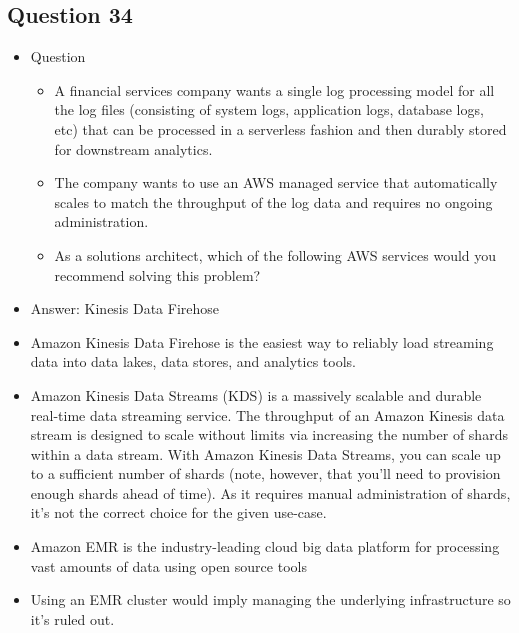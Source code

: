 \documentclass[]{scrartcl}
\begin{document}
\subsection{Question 34}
\begin{itemize}
	\item Question
	\begin{itemize}
		\item A financial services company wants a single log processing model for all the log files (consisting of system logs, application logs, database logs, etc) that can be processed in a serverless fashion and then durably stored for downstream analytics. 
		\item The company wants to use an AWS managed service that automatically scales to match the throughput of the log data and requires no ongoing administration.
		\item As a solutions architect, which of the following AWS services would you recommend solving this problem?
	\end{itemize}
	\item Answer: Kinesis Data Firehose
	\item Amazon Kinesis Data Firehose is the easiest way to reliably load streaming data into data lakes, data stores, and analytics tools.
	\item Amazon Kinesis Data Streams (KDS) is a massively scalable and durable real-time data streaming service. The throughput of an Amazon Kinesis data stream is designed to scale without limits via increasing the number of shards within a data stream. With Amazon Kinesis Data Streams, you can scale up to a sufficient number of shards (note, however, that you'll need to provision enough shards ahead of time). As it requires manual administration of shards, it's not the correct choice for the given use-case.
	\item Amazon EMR is the industry-leading cloud big data platform for processing vast amounts of data using open source tools
	\item Using an EMR cluster would imply managing the underlying infrastructure so it’s ruled out.
\end{itemize}
\end{document}
